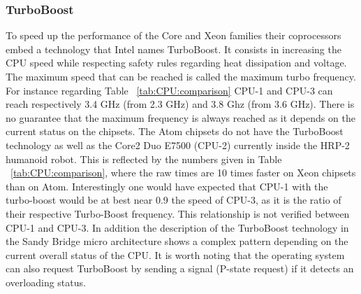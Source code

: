 \subsubsection{TurboBoost}
To speed up the performance of the Core and Xeon families their coprocessors embed
a technology that Intel names TurboBoost. It consists in increasing the CPU speed while respecting safety rules 
regarding heat dissipation and voltage. The maximum speed that can be reached is called the maximum turbo frequency.
For instance regarding Table ~\ref{tab:CPU:comparison} CPU-1 and CPU-3 can reach respectively 3.4 GHz (from 2.3 GHz) and 
3.8 Ghz (from 3.6 GHz). There is no guarantee that the maximum frequency is always reached as it depends on the
current status on the chipsets. The Atom chipsets do not have the TurboBoost technology as well as the Core2 Duo E7500 (CPU-2)
currently inside the HRP-2 humanoid robot. This is reflected by the numbers given in Table ~\ref{tab:CPU:comparison},
where the raw times are 10 times faster on Xeon chipsets than on Atom. Interestingly one would have expected
that CPU-1 with the turbo-boost would be at best near 0.9 the speed of CPU-3, as it is the ratio of their respective
Turbo-Boost frequency. This relationship is not verified between CPU-1 and CPU-3. 
In addition the description of the TurboBoost technology in the Sandy Bridge micro architecture \cite{Rotem:IEEEMicro:2012}
shows a complex pattern depending on the current overall status of the CPU.
It is worth noting that the operating system can also request TurboBoost by sending a signal (P-state request) if it detects an overloading status. 

